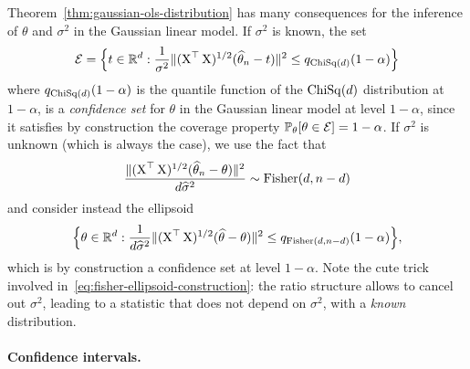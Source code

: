 Theorem~\ref{thm:gaussian-ols-distribution} has many consequences for the inference of $\theta$ and $\sigma^2$ in the Gaussian linear model.
If $\sigma^2$ is known, the set
\begin{equation*}
	\operatorname{{\mathcal E}} = \Big \{ t \in \mathbb R^d : \frac{1}{\sigma^2} \| (\operatorname{{\boldsymbol X}}^\top \operatorname{{\boldsymbol X}})^{1/2} (\widehat \theta_n - t) \|^2 \leq q_{\operatorname{ChiSq}(d)}(1 - \alpha)  \Big\}
\end{equation*}
where $q_{\operatorname{ChiSq}(d)}(1 - \alpha)$ is the quantile function of the $\operatorname{ChiSq}(d)$ distribution at $1 - \alpha$, is a \emph{confidence set}%
for $\theta$ in the Gaussian linear model at level $1 - \alpha$, since it satisfies by construction the coverage property $\mathbb P_\theta[ \theta \in \operatorname{{\mathcal E}}] = 1 - \alpha$.
If $\sigma^2$ is unknown (which is always the case), we use the fact%
that
\begin{equation*}
	\frac{\| (\operatorname{{\boldsymbol X}}^\top \operatorname{{\boldsymbol X}})^{1/2}(\widehat \theta_n - \theta) \|^2}{d \widehat \sigma^2} \sim \operatorname{Fisher}(d, n-d)
\end{equation*}
and consider instead the ellipsoid
\begin{equation}
	\label{eq:fisher-ellipsoid-construction}
	\Big \{ \theta \in \mathbb R^d : \frac{1}{d \widehat \sigma^2} \| (\operatorname{{\boldsymbol X}}^\top \operatorname{{\boldsymbol X}})^{1/2} (\widehat \theta - \theta) \|^2 \leq q_{\operatorname{Fisher}(d, n - d)}(1 - \alpha)  \Big\},
\end{equation}
which is by construction a confidence set at level $1 - \alpha$.
Note the cute trick involved in~\eqref{eq:fisher-ellipsoid-construction}: the ratio structure allows to cancel out $\sigma^2$, leading to a statistic that does not depend on $\sigma^2$, with a \emph{known} distribution.


\paragraph{Confidence intervals.}

